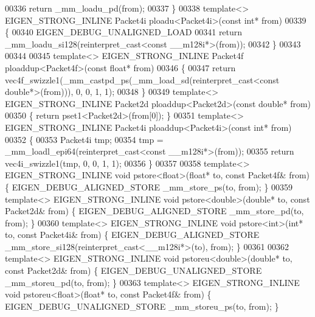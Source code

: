 \begin{DoxyCode}
00336   \textcolor{keywordflow}{return} \_mm\_loadu\_pd(from);
00337 \}
00338 \textcolor{keyword}{template}<> EIGEN\_STRONG\_INLINE Packet4i ploadu<Packet4i>(\textcolor{keyword}{const} \textcolor{keywordtype}{int}* from)
00339 \{
00340   EIGEN\_DEBUG\_UNALIGNED\_LOAD
00341   \textcolor{keywordflow}{return} \_mm\_loadu\_si128(reinterpret\_cast<const \_\_m128i*>(from));
00342 \}
00343 
00344 
00345 \textcolor{keyword}{template}<> EIGEN\_STRONG\_INLINE Packet4f ploaddup<Packet4f>(\textcolor{keyword}{const} \textcolor{keywordtype}{float}*   from)
00346 \{
00347   \textcolor{keywordflow}{return} vec4f\_swizzle1(\_mm\_castpd\_ps(\_mm\_load\_sd(reinterpret\_cast<const double*>(from))), 0, 0, 1, 1);
00348 \}
00349 \textcolor{keyword}{template}<> EIGEN\_STRONG\_INLINE Packet2d ploaddup<Packet2d>(\textcolor{keyword}{const} \textcolor{keywordtype}{double}*  from)
00350 \{ \textcolor{keywordflow}{return} pset1<Packet2d>(from[0]); \}
00351 \textcolor{keyword}{template}<> EIGEN\_STRONG\_INLINE Packet4i ploaddup<Packet4i>(\textcolor{keyword}{const} \textcolor{keywordtype}{int}*     from)
00352 \{
00353   Packet4i tmp;
00354   tmp = \_mm\_loadl\_epi64(reinterpret\_cast<const \_\_m128i*>(from));
00355   \textcolor{keywordflow}{return} vec4i\_swizzle1(tmp, 0, 0, 1, 1);
00356 \}
00357 
00358 \textcolor{keyword}{template}<> EIGEN\_STRONG\_INLINE \textcolor{keywordtype}{void} pstore<float>(\textcolor{keywordtype}{float}*   to, \textcolor{keyword}{const} Packet4f& from) \{ 
      EIGEN\_DEBUG\_ALIGNED\_STORE \_mm\_store\_ps(to, from); \}
00359 \textcolor{keyword}{template}<> EIGEN\_STRONG\_INLINE \textcolor{keywordtype}{void} pstore<double>(\textcolor{keywordtype}{double}* to, \textcolor{keyword}{const} Packet2d& from) \{ 
      EIGEN\_DEBUG\_ALIGNED\_STORE \_mm\_store\_pd(to, from); \}
00360 \textcolor{keyword}{template}<> EIGEN\_STRONG\_INLINE \textcolor{keywordtype}{void} pstore<int>(\textcolor{keywordtype}{int}*       to, \textcolor{keyword}{const} Packet4i& from) \{ 
      EIGEN\_DEBUG\_ALIGNED\_STORE \_mm\_store\_si128(reinterpret\_cast<\_\_m128i*>(to), from); \}
00361 
00362 \textcolor{keyword}{template}<> EIGEN\_STRONG\_INLINE \textcolor{keywordtype}{void} pstoreu<double>(\textcolor{keywordtype}{double}* to, \textcolor{keyword}{const} Packet2d& from) \{ 
      EIGEN\_DEBUG\_UNALIGNED\_STORE \_mm\_storeu\_pd(to, from); \}
00363 \textcolor{keyword}{template}<> EIGEN\_STRONG\_INLINE \textcolor{keywordtype}{void} pstoreu<float>(\textcolor{keywordtype}{float}*   to, \textcolor{keyword}{const} Packet4f& from) \{ 
      EIGEN\_DEBUG\_UNALIGNED\_STORE \_mm\_storeu\_ps(to, from); \}

\end{DoxyCode}
